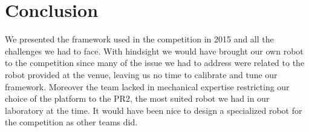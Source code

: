 \documentclass[letterpaper, 10pt, conference]{ieeeconf}
\begin{document}












\section{Conclusion}
\label{sec:conclusion}

We presented the framework used in the competition in 2015 and all the challenges we had to face. With hindsight we would have brought our own robot to the competition since many of the issue we had to address were related to the robot provided at the venue, leaving us no time to calibrate and tune our framework. Moreover the team lacked in mechanical expertise restricting our choice of the platform to the PR2, the most suited robot we had in our laboratory at the time. It would have been nice to design a specialized robot for the competition as other teams did. 



\end{document}
